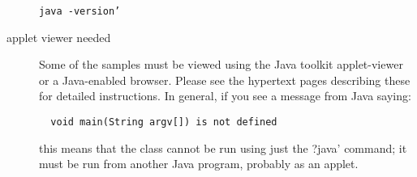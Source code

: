 \begin{description}
\begin{verbatim}
java -version’
\end{verbatim}
\item[applet viewer needed] Some of the samples must be viewed using the Java toolkit applet-viewer or a Java-enabled browser. Please see the hypertext pages describing these for detailed instructions. In general, if you see a message from Java saying:
\begin{verbatim}
  void main(String argv[]) is not defined
\end{verbatim}
this means that the class cannot be run using just the ?java’ command; it must be run from another Java program, probably as an applet.
\end{description} 